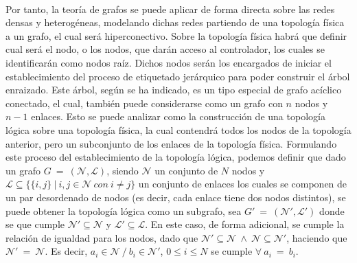 \\
Por tanto, la teoría de grafos se puede aplicar de forma directa sobre las redes densas y heterogéneas, modelando dichas redes partiendo de una topología física a un grafo, el cual será hiperconectivo. Sobre la topología física habrá que definir cual será el nodo, o los nodos, que darán acceso al controlador, los cuales se identificarán como nodos raíz. Dichos nodos serán los encargados de iniciar el establecimiento del proceso de etiquetado jerárquico para poder construir el árbol enraizado. Este árbol, según se ha indicado, es un tipo especial de grafo acíclico conectado, el cual, también puede considerarse como un grafo con $n$ nodos y $n-1$ enlaces. Esto se puede analizar como la construcción de una topología lógica sobre una topología física, la cual contendrá todos los nodos de la topología anterior, pero un subconjunto de los enlaces de la topología física. Formulando este proceso del establecimiento de la topología lógica, podemos definir que dado un grafo $G \: = \: (\mathcal{N}, \mathcal{L})$, siendo  $\mathcal{N}$ un conjunto de $N$ nodos y $\mathcal{L} \subseteq \{\{i,j\} \: | \: i,j \in \mathcal{N} \: con \: i \neq j\}$ un conjunto de enlaces los cuales se componen de un par desordenado de nodos (es decir, cada enlace tiene dos nodos distintos), se puede obtener la topología lógica como un subgrafo, sea $G' \: = \: (\mathcal{N}', \mathcal{L}')$ donde se que cumple $\mathcal{N}' \subseteq \mathcal{N}$ y $\mathcal{L}' \subseteq \mathcal{L}$. En este caso, de forma adicional, se cumple la relación de igualdad para los nodos, dado que $\mathcal{N}' \subseteq \mathcal{N} \: \wedge \: \mathcal{N} \subseteq \mathcal{N}' $, haciendo que $\mathcal{N}' \: = \: \mathcal{N}$. Es decir, $a_{i} \in \mathcal{N} \: / \: b_{i} \in \mathcal{N}'$, $0 \leq i \leq N$ se cumple $\forall \: a_{i} \: = \: b_{i}$.\\
\\

